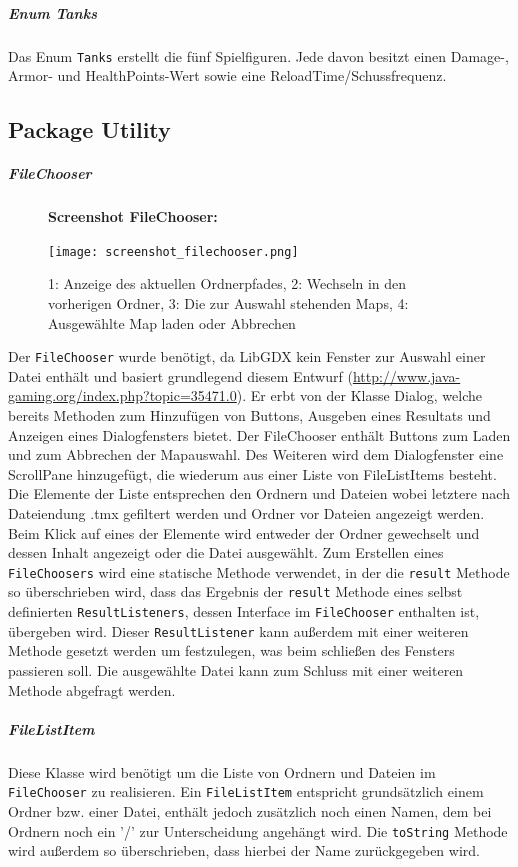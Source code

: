 \documentclass[10pt]{report}
\def\code#1{\texttt{#1}}
\begin{document}
\subparagraph{Enum Tanks}
Das Enum \code{Tanks} erstellt die fünf Spielfiguren. Jede davon besitzt einen Damage-, Armor- und HealthPoints-Wert sowie eine ReloadTime/Schussfrequenz. 

\newpage
\subsection{Package Utility}
\subparagraph{FileChooser}
\begin{figure}[H]
  \textbf{Screenshot FileChooser:}\par\medskip
  \centering
\texttt{[image: screenshot\_filechooser.png]}  
\caption{1: Anzeige des aktuellen Ordnerpfades, 2: Wechseln in den vorherigen Ordner, 3: Die zur Auswahl stehenden Maps, 4: Ausgewählte Map laden oder Abbrechen}
\end{figure}

Der \code{FileChooser} wurde benötigt, da LibGDX kein Fenster zur Auswahl einer Datei enthält und basiert grundlegend diesem Entwurf (\url{http://www.java-gaming.org/index.php?topic=35471.0}).
Er erbt von der Klasse Dialog, welche bereits Methoden zum Hinzufügen von Buttons, Ausgeben eines Resultats und Anzeigen eines Dialogfensters bietet. Der FileChooser enthält Buttons zum Laden und zum Abbrechen der Mapauswahl. Des Weiteren wird dem Dialogfenster eine ScrollPane hinzugefügt, die wiederum aus einer Liste von FileListItems besteht. Die Elemente der Liste entsprechen den Ordnern und Dateien wobei letztere nach Dateiendung .tmx gefiltert werden und Ordner vor Dateien angezeigt werden. Beim Klick auf eines der Elemente wird entweder der Ordner gewechselt und dessen Inhalt angezeigt oder die Datei ausgewählt. Zum Erstellen eines \code{FileChoosers} wird eine statische Methode verwendet, in der die \code{result} Methode so überschrieben wird, dass das Ergebnis der \code{result} Methode eines selbst definierten \code{ResultListeners}, dessen Interface im \code{FileChooser} enthalten ist, übergeben wird. Dieser \code{ResultListener} kann außerdem mit einer weiteren Methode gesetzt werden um festzulegen, was beim schließen des Fensters passieren soll. Die ausgewählte Datei kann zum Schluss mit einer weiteren Methode abgefragt werden.

\subparagraph{FileListItem}
Diese Klasse wird benötigt um die Liste von Ordnern und Dateien im \code{FileChooser} zu realisieren. Ein \code{FileListItem} entspricht grundsätzlich einem Ordner bzw. einer Datei, enthält jedoch zusätzlich noch einen Namen, dem bei Ordnern noch ein '/' zur Unterscheidung angehängt wird. Die \code{toString} Methode wird außerdem so überschrieben, dass hierbei der Name zurückgegeben wird.
\end{document}
